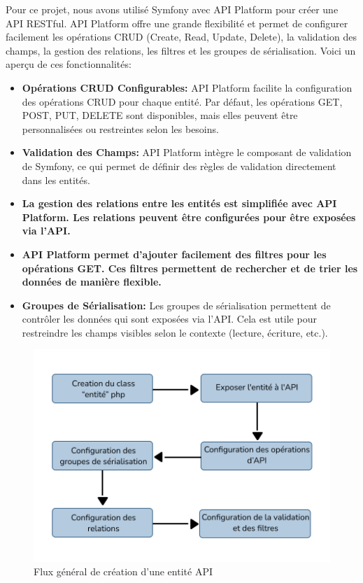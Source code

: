 Pour ce projet, nous avons utilisé Symfony avec API Platform pour créer une API RESTful. API Platform offre une grande flexibilité et permet de configurer facilement les opérations CRUD (Create, Read, Update, Delete), la validation des champs, la gestion des relations, les filtres et les groupes de sérialisation. Voici un aperçu de ces fonctionnalités:

\begin{itemize}
  \item \textbf{Opérations CRUD Configurables: }API Platform facilite la configuration des opérations CRUD pour chaque entité. Par défaut, les opérations GET, POST, PUT, DELETE sont disponibles, mais elles peuvent être personnalisées ou restreintes selon les besoins.
  \item \textbf{Validation des Champs: }API Platform intègre le composant de validation de Symfony, ce qui permet de définir des règles de validation directement dans les entités.
  \item \textbf{La gestion des relations entre les entités est simplifiée avec API Platform. Les relations peuvent être configurées pour être exposées via l'API.}
  \item \textbf{API Platform permet d'ajouter facilement des filtres pour les opérations GET. Ces filtres permettent de rechercher et de trier les données de manière flexible.}
  \item \textbf{Groupes de Sérialisation: }Les groupes de sérialisation permettent de contrôler les données qui sont exposées via l'API. Cela est utile pour restreindre les champs visibles selon le contexte (lecture, écriture, etc.).
\end{itemize}

\begin{figure}[H] 
    \centering
    \includegraphics[scale=0.9]{Figures/api_entity.png}
    \caption{Flux général de création d'une entité API}
\end{figure}

